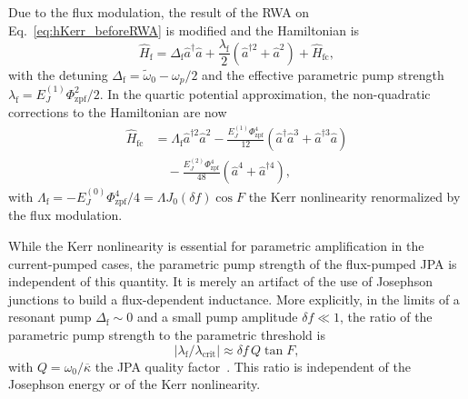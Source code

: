\documentclass[pra,twocolumn,superscriptaddress]{revtex4-1}
\newcommand{\ah}[0]{\hat{a}}
\newcommand{\lcrit}[0]{\lambda_{\mathrm{crit}}}
\newcommand{\lfp}[0]{\lambda_{\mathrm{f}}}
\newcommand{\Dfp}[0]{\Delta_{\mathrm{f}}}
\newcommand{\Lfp}[0]{\Lambda_{\mathrm{f}}}
\newcommand{\corrFluxPump}[0]{\hat{H}_{\mathrm{fc}}}
\newcommand{\df}[0]{\delta\!f}
\newcommand{\kappaTot}[0]{\overline{\kappa}}
\newcommand{\ffpz}[0]{\Phi_{\mathrm{zpf}}}
\newcommand{\parO}[1]{\left(#1\right)}
\newcommand{\abs}[1]{\left|#1\right|}
\begin{document}
Due to the flux modulation, the result of the RWA on Eq.~\eqref{eq:hKerr_beforeRWA} is modified and the Hamiltonian is
% 
\begin{equation}
	\hat H_{\mathrm{f}} = \Dfp \ah^\dagger \ah + \frac{\lfp}{2} \parO{\ah^{\dagger 2} + \ah^2} 
	+ \corrFluxPump,
\end{equation}
% 
 with the detuning $\Dfp = \tilde{\omega}_0- \omega_{p}/2$ and the effective parametric pump strength $\lfp = E_J^{(1)}\ffpz^2/2$. In the quartic potential approximation, the non-quadratic corrections to the Hamiltonian are now
 \begin{equation}
 \begin{split}
 	\corrFluxPump &= 
 	\Lfp \ah^{\dagger 2 }\ah^{2} 
 	-
 	\frac{E_J^{(1)} \ffpz^4}{12}\parO{  \ah^\dagger \ah^3 + \ah^{\dag 3}\ah}
 	\\ &\quad
 	- \frac{E_J^{(2)}\ffpz^4}{48}\parO{  \ah^4 + \ah^{\dag 4}},
 	\label{eq::corrFluxPump}
\end{split}
 \end{equation}
 with
 $ \Lfp= - E_J^{(0)} \ffpz^4 /4 = \Lambda J_0(\df) \cos F $ the Kerr nonlinearity renormalized by the flux modulation.
 
While the Kerr nonlinearity is essential for parametric amplification in the current-pumped cases, the parametric pump strength of the flux-pumped JPA is independent of this quantity. It is merely an artifact of the use of Josephson junctions to build a flux-dependent inductance.  
% 
More explicitly, in the limits of a resonant pump $\Dfp \sim0$ and a small pump amplitude $\df \ll 1$, 
 the ratio of the parametric pump strength to the parametric threshold is
\begin{equation}
	\abs{\lfp/\lcrit } 
	\approx  \df \, Q \tan F ,
	 \label{eq::fluxPumpParametricStrength}
\end{equation}
% 
with $Q = \omega_0/\kappaTot$ the JPA quality factor~\cite{Zhou:2014fk}. This ratio is independent of the Josephson energy or of the Kerr nonlinearity. 
\end{document}
